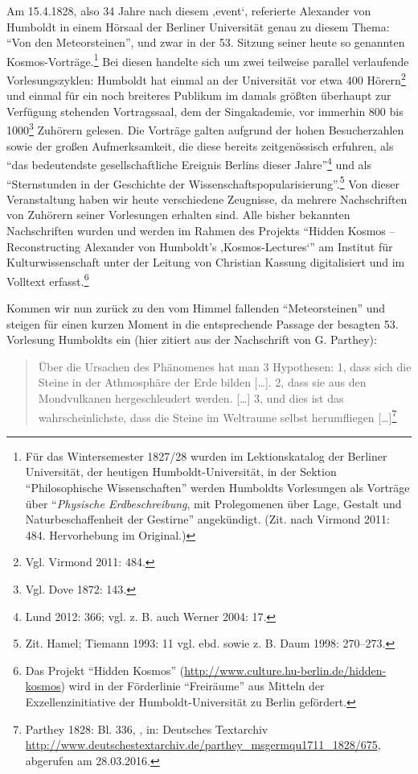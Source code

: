 \documentclass[output=paper]{langsci/langscibook}
\begin{document}
Am 15.4.1828, also 34 Jahre nach diesem ‚event`, referierte Alexander
von Humboldt in einem Hörsaal der Berliner Universität genau zu diesem
Thema: \enquote{Von den Meteorsteinen}, und zwar in der 53. Sitzung
seiner heute so genannten Kos\-mos-Vorträge.\footnote{Für das
  Wintersemester 1827/28 wurden im Lektionskatalog der Berliner
  Universität, der heutigen Humboldt-Universität, in der Sektion
  \enquote{Philosophische Wissenschaften} werden Humboldts Vorlesungen
  als Vorträge über \enquote{\emph{Physische Erdbeschreibung}, mit
  Prolegomenen über Lage, Gestalt und Naturbeschaffenheit der Gestirne}
  angekündigt. (Zit. nach Virmond 2011: 484. Hervorhebung im Original.)}
Bei diesen handelte sich um zwei teilweise parallel verlaufende
Vorlesungszyklen: Humboldt hat einmal an der Universität vor etwa 400
Hörern\footnote{Vgl. Virmond 2011: 484.} und einmal für ein noch
breiteres Publikum im damals größten überhaupt zur Verfügung stehenden
Vortragssaal, dem der Singakademie, vor immerhin 800 bis 1000\footnote{Vgl.
  Dove 1872: 143.} Zuhörern gelesen. Die Vorträge galten aufgrund der
hohen Besucherzahlen sowie der großen Aufmerksamkeit, die diese bereits
zeitgenössisch erfuhren, als \enquote{das bedeutendste gesellschaftliche
Ereignis Berlins dieser Jahre}\footnote{Lund 2012: 366; vgl. z. B. auch
  Werner 2004: 17.} und als \enquote{Sternstunden in der Geschichte der
Wissenschaftspopularisierung}.\footnote{Zit. Hamel; Tiemann 1993: 11
  vgl. ebd. sowie z. B. Daum 1998: 270--273.} Von dieser Veranstaltung
haben wir heute verschiedene Zeugnisse, da mehrere Nachschriften von
Zuhörern seiner Vorlesungen erhalten sind. Alle bisher bekannten
Nachschriften wurden und werden im Rahmen des Projekts \enquote{Hidden
Kosmos -- Reconstructing Alexander von Humboldt's ‚Kosmos-Lectures`} am
Institut für Kulturwissenschaft unter der Leitung von Christian Kassung
digitalisiert und im Volltext erfasst.\footnote{Das Projekt
  \enquote{Hidden Kosmos}
  (\url{http://www.culture.hu-berlin.de/hidden-kosmos}) wird in der
  Förderlinie \enquote{Freiräume} aus Mitteln der Exzellenzinitiative
  der Humboldt-Universität zu Berlin gefördert.}

Kommen wir nun zurück zu den vom Himmel fallenden
\enquote{Meteorsteinen} und steigen für einen kurzen Moment in die
entsprechende Passage der besagten 53. Vorlesung Humboldts ein (hier
zitiert aus der Nachschrift von G. Parthey):

\begin{quote}
Über die Ursachen des Phänomenes hat man 3 Hypothesen: 1, dass sich die
Steine in der Athmosphäre der Erde bilden {[}\ldots{}{]}. 2, dass sie
aus den Mondvulkanen hergeschleudert werden. {[}\ldots{}{]} 3, und dies
ist das wahrscheinlichste, dass die Steine im Weltraume selbst
herumfliegen {[}\ldots{}{]}\footnote{Parthey 1828: Bl. 336, , in:
  Deutsches Textarchiv
  \url{http://www.deutschestextarchiv.de/parthey_msgermqu1711_1828/675},
  abgerufen am 28.03.2016.}
\end{quote}
\end{document}
